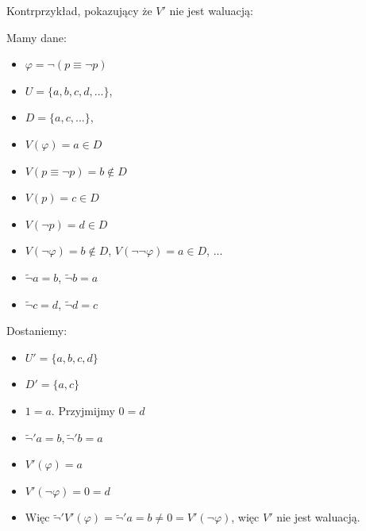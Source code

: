 \documentclass{article}
\theoremstyle{definition}
\theoremstyle{definition}
\theoremstyle{definition}
\newcommand*{\id}{\equiv}
\begin{document}
Kontrprzykład, pokazujący że $V'$ nie jest waluacją:

Mamy dane:

\begin{itemize}
  \item $\varphi = \lnot(p \id \lnot p)$
  \item $U = \{a, b, c, d, ...\}$,
  \item $D = \{a, c, ...\}$,
  \item $V(\varphi) = a \in D$
  \item $V(p \id \lnot p) = b \not \in D$
  \item $V(p) = c \in D$
  \item $V(\lnot p) = d \in D$
  \item $V(\lnot \varphi) = b \not \in D$, $V(\lnot \lnot \varphi) = a \in D$, ...
  \item $\tilde{\lnot}a = b$, $\tilde{\lnot}b = a$
  \item $\tilde{\lnot}c = d$, $\tilde{\lnot}d = c$
\end{itemize}


Dostaniemy:
\begin{itemize}
  \item $U' = \{a, b, c, d\}$
  \item $D' = \{a, c\}$
  \item $1 = a$. Przyjmijmy $0 = d$
  \item $\tilde{\lnot}'a = b, \tilde{\lnot}'b = a$
  \item $V'(\varphi) = a$
  \item $V'(\lnot \varphi) = 0 = d$
  \item Więc $\tilde{\lnot}'V'(\varphi) = \tilde{\lnot}'a = b \not = 0 = V'(\lnot
          \varphi)$, więc $V'$ nie jest waluacją.
\end{itemize}
\end{document}
